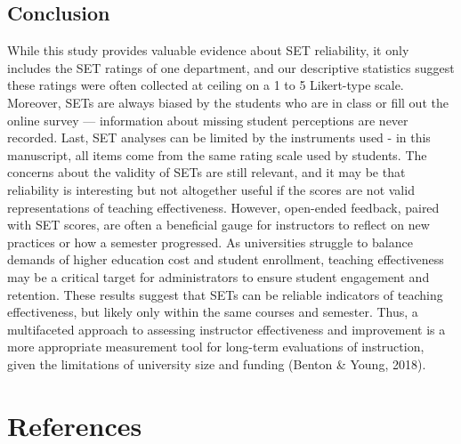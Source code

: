 \documentclass[
  man]{apa7}
\begin{document}
\subsection{Conclusion}\label{conclusion}

While this study provides valuable evidence about SET reliability, it
only includes the SET ratings of one department, and our descriptive
statistics suggest these ratings were often collected at ceiling on a 1
to 5 Likert-type scale. Moreover, SETs are always biased by the students
who are in class or fill out the online survey --- information about
missing student perceptions are never recorded. Last, SET analyses can
be limited by the instruments used - in this manuscript, all items come
from the same rating scale used by students. The concerns about the
validity of SETs are still relevant, and it may be that reliability is
interesting but not altogether useful if the scores are not valid
representations of teaching effectiveness. However, open-ended feedback,
paired with SET scores, are often a beneficial gauge for instructors to
reflect on new practices or how a semester progressed. As universities
struggle to balance demands of higher education cost and student
enrollment, teaching effectiveness may be a critical target for
administrators to ensure student engagement and retention. These results
suggest that SETs can be reliable indicators of teaching effectiveness,
but likely only within the same courses and semester. Thus, a
multifaceted approach to assessing instructor effectiveness and
improvement is a more appropriate measurement tool for long-term
evaluations of instruction, given the limitations of university size and
funding (Benton \& Young, 2018).

\newpage

\section{References}\label{references}
\end{document}
